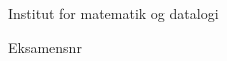 \maketitle

\thispagestyle{empty}
\hrulefill
\begin{center}
Institut for matematik og datalogi
\end{center}

\vspace{1cm}
Eksamensnr




